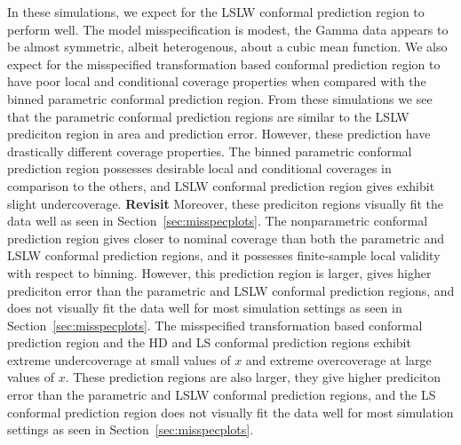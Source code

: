 \documentclass[11pt]{article}\usepackage[]{graphicx}\usepackage[]{color}
\begin{document}
In these simulations, we expect for the LSLW conformal prediction region to 
perform well.  The model misspecification is modest, the Gamma data  
appears to be almost symmetric, albeit heterogenous, about a cubic mean 
function.  
We also expect for the misspecified transformation based conformal 
prediction region to have poor local and conditional coverage properties 
when compared with the binned parametric conformal prediction region.
From these simulations we see that the parametric conformal 
prediction regions are similar to the LSLW prediciton region in area and 
prediction error.  However, these prediction have drastically different 
coverage properties.  The binned parametric conformal prediction region 
possesses desirable local and conditional coverages in comparison to the 
others, and LSLW conformal prediction region gives exhibit slight 
undercoverage.  {\bf Revisit} Moreover, these prediciton regions visually 
fit the data well as seen in Section~\ref{sec:misspecplots}.
The nonparametric conformal prediction region gives closer to nominal 
coverage than both the parametric and LSLW conformal prediction regions, 
and it possesses finite-sample local validity with respect to 
binning.  However, this prediction region is larger, gives higher 
prediciton error than the parametric and LSLW conformal prediction 
regions, and does not visually fit the data well for most simulation settings 
as seen in Section~\ref{sec:misspecplots}.  The misspecified transformation 
based conformal prediction region and the HD and LS 
conformal prediction regions exhibit extreme undercoverage at small values 
of $x$ and extreme overcoverage at large values of $x$.  These prediction 
regions are also larger, they give higher prediciton error than the 
parametric and LSLW conformal prediction regions, and the LS conformal 
prediction region does not visually fit the data well for most simulation 
settings as seen in Section~\ref{sec:misspecplots}. 



\end{document}
